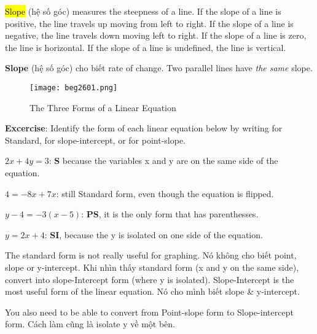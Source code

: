 \hl{Slope} (hệ số góc) measures the steepness of a line. If the slope of a line is positive, the line travels up moving from left to right. If the slope of a line is negative, the line travels down moving left to right. If the slope of a line is zero, the line is horizontal. If the slope of a line is undefined, the line is vertical.

\textbf{Slope} (hệ số góc) cho biết rate of change. Two parallel lines have \textit{the same} slope.


\begin{figure}[htb!]
  \centering
  \texttt{[image: beg2601.png]}
  \caption{The Three Forms of a Linear Equation}
\end{figure}



\textbf{Excercise}: Identify the form of each linear equation below by writing  for Standard,  for slope-intercept, or  for point-slope.

$2x+4y=3$: \textbf{S} because the variables x and y are on the same side of the equation.

$4=-8x+7x$: still Standard form, even though the equation is flipped.

$y-4=-3(x-5)$: \textbf{PS}, it is the only form that has parenthesses.

$y=2x+4$: \textbf{SI}, because the y is isolated on one side of the equation.


\vspace{.6cm}

The standard form is not really useful for graphing. Nó không cho biết point, slope or y-intercept. Khi nhìn thấy standard form (x and y on the same side), convert into slope-Intercept form (where y is isolated). Slope-Intercept is the most useful form of the linear equation. Nó cho mình biết slope \& y-intercept.

You also need to be able to convert from Point-slope form to Slope-intercept form. Cách làm cũng là isolate y về một bên.


\vspace{2 cm}

